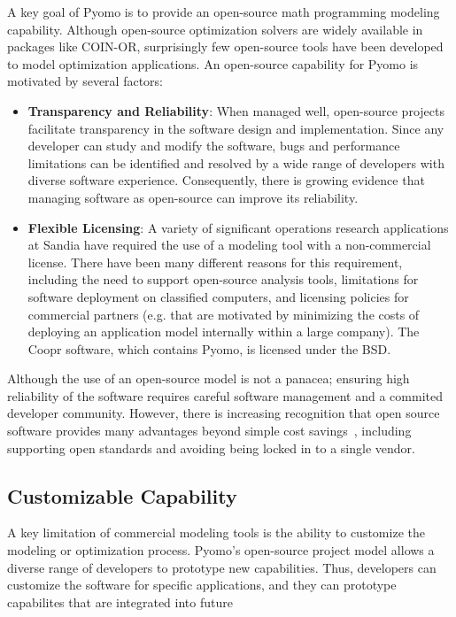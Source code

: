 A key goal of Pyomo is to provide an open-source math programming
modeling capability.  Although open-source optimization solvers are widely
available in packages like COIN-OR, surprisingly few open-source tools
have been developed to model optimization applications.  An open-source
capability for Pyomo is motivated by several factors:
\begin{itemize}

\item {\bf Transparency and Reliability}: When managed well,
open-source projects facilitate transparency in the software design and
implementation. Since any developer can study and modify the software,
bugs and performance limitations can be identified and resolved by a wide
range of developers with diverse software experience.  Consequently,
there is growing evidence that managing software as open-source can
improve its reliability.

\item {\bf Flexible Licensing}: A variety of significant operations
research applications at Sandia have required the use of a modeling tool
with a non-commercial license.  There have been many different reasons
for this requirement, including the need to support open-source analysis
tools, limitations for software deployment on classified computers,
and licensing policies for commercial partners (e.g. that are motivated
by minimizing the costs of deploying an application model internally
within a large company).  The Coopr software, which contains Pyomo,
is licensed under the BSD.

\end{itemize} Although the use of an open-source model is not a panacea;
ensuring high reliability of the software requires careful software
management and a commited developer community.  However, there is
increasing recognition that open source software provides many advantages
beyond simple cost savings~\citep{Forrester}, including supporting open
standards and avoiding being locked in to a single vendor.


\subsection{Customizable Capability}

A key limitation of commercial modeling tools is the ability to customize
the modeling or optimization process.  Pyomo's open-source project model
allows a diverse range of developers to prototype new capabilities.
Thus, developers can customize the software for specific applications,
and they can prototype capabilites that are integrated into future

